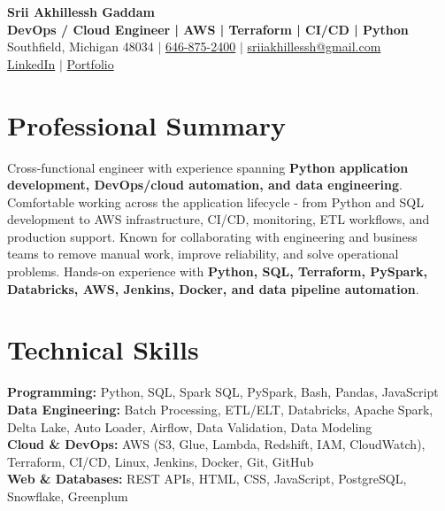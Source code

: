 \documentclass[letterpaper,10pt]{article}
\begin{document}
\fontsize{9.35pt}{10.45pt}\selectfont

\begin{center}
    {\LARGE \textbf{Srii Akhillessh Gaddam}} \\[-1pt]
    \textbf{DevOps / Cloud Engineer | AWS | Terraform | CI/CD | Python} \\[2pt]
    Southfield, Michigan 48034 $|$
    \href{tel:6468752400}{646-875-2400} $|$
    \href{mailto:sriiakhillessh@gmail.com}{sriiakhillessh@gmail.com} \\[1pt]
    \href{https://www.linkedin.com/in/srii-akhiilessh-gaddam-b48668191/}{LinkedIn} $|$
    \href{https://sriiakhillesshg.github.io/portfolio/}{Portfolio}
\end{center}
\vspace{-8pt}

\section{Professional Summary}
\small{Cross-functional engineer with experience spanning \textbf{Python application development, DevOps/cloud automation, and data engineering}. Comfortable working across the application lifecycle - from Python and SQL development to AWS infrastructure, CI/CD, monitoring, ETL workflows, and production support. Known for collaborating with engineering and business teams to remove manual work, improve reliability, and solve operational problems. Hands-on experience with \textbf{Python, SQL, Terraform, PySpark, Databricks, AWS, Jenkins, Docker, and data pipeline automation}.}

\section{Technical Skills}
\small{
\textbf{Programming:} Python, SQL, Spark SQL, PySpark, Bash, Pandas, JavaScript \\
\textbf{Data Engineering:} Batch Processing, ETL/ELT, Databricks, Apache Spark, Delta Lake, Auto Loader, Airflow, Data Validation, Data Modeling \\
\textbf{Cloud \& DevOps:} AWS (S3, Glue, Lambda, Redshift, IAM, CloudWatch), Terraform, CI/CD, Linux, Jenkins, Docker, Git, GitHub \\
\textbf{Web \& Databases:} REST APIs, HTML, CSS, JavaScript, PostgreSQL, Snowflake, Greenplum
}
\end{document}
